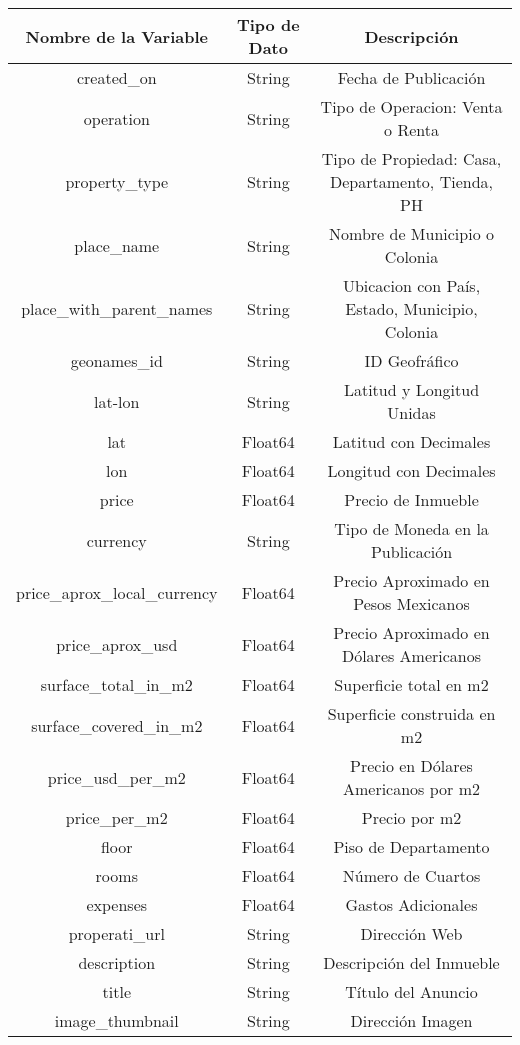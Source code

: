 \documentclass{report}
\begin{document}
    \begin{center}
        \begin{tabular}{||c|c|c||} 
        \hline
        Nombre de la Variable & Tipo de Dato & Descripción \\
        \hline\hline
        created\_on  & String & Fecha de Publicación \\
        \hline
        operation & String & Tipo de Operacion: Venta o Renta \\
        \hline
        property\_type & String & Tipo de Propiedad: Casa, Departamento, Tienda, PH\\
        \hline
        place\_name & String & Nombre de Municipio o Colonia\\ 
        \hline
        place\_with\_parent\_names & String & Ubicacion con País, Estado, Municipio, Colonia\\
        \hline
        geonames\_id & String & ID Geofráfico\\
        \hline
        lat-lon & String & Latitud y Longitud Unidas\\
        \hline
        lat & Float64 & Latitud con Decimales\\
        \hline
        lon & Float64 & Longitud con Decimales\\
        \hline
        price & Float64 & Precio de Inmueble\\
        \hline
        currency & String & Tipo de Moneda en la Publicación\\
        \hline
        price\_aprox\_local\_currency & Float64 & Precio Aproximado en Pesos Mexicanos\\
        \hline
        price\_aprox\_usd & Float64 & Precio Aproximado en Dólares Americanos\\
        \hline
        surface\_total\_in\_m2 & Float64 & Superficie total en m2\\
        \hline
        surface\_covered\_in\_m2 & Float64 & Superficie construida en m2\\
        \hline
        price\_usd\_per\_m2 & Float64 & Precio en Dólares Americanos por m2\\
        \hline
        price\_per\_m2 & Float64 & Precio por m2\\
        \hline
        floor & Float64 & Piso de Departamento\\
        \hline
        rooms & Float64 & Número de Cuartos\\
        \hline
        expenses & Float64 & Gastos Adicionales\\
        \hline
        properati\_url & String & Dirección Web\\
        \hline
        description & String & Descripción del Inmueble\\
        \hline
        title & String & Título del Anuncio\\
        \hline
        image\_thumbnail & String & Dirección Imagen\\
        \hline
 
        \end{tabular}
    \end{center}
    
\end{document}
